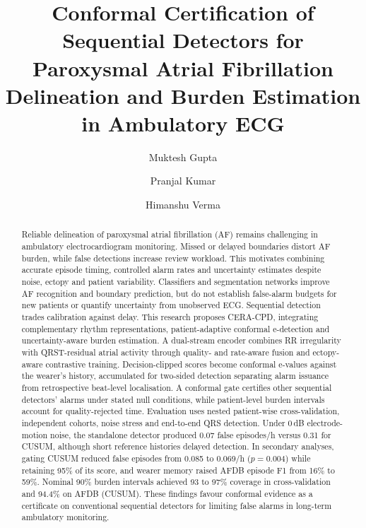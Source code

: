 \documentclass[preprint,12pt]{elsarticle}
\newcommand{\method}{CERA-CPD}
\newcommand{\1}{\mathbf{1}}
\begin{document}
\begin{frontmatter}

\title{Conformal Certification of Sequential Detectors for Paroxysmal Atrial Fibrillation Delineation and Burden Estimation in Ambulatory ECG}

\author[nitj]{Muktesh Gupta}
\author[nitj]{Pranjal Kumar}
\author[nitj]{Himanshu Verma}



\begin{abstract}
Reliable delineation of paroxysmal atrial fibrillation (AF) remains challenging in ambulatory electrocardiogram monitoring. Missed or delayed boundaries distort AF burden, while false detections increase review workload. This motivates combining accurate episode timing, controlled alarm rates and uncertainty estimates despite noise, ectopy and patient variability. Classifiers and segmentation networks improve AF recognition and boundary prediction, but do not establish false-alarm budgets for new patients or quantify uncertainty from unobserved ECG. Sequential detection trades calibration against delay. This research proposes \method{}, integrating complementary rhythm representations, patient-adaptive conformal e-detection and uncertainty-aware burden estimation. A dual-stream encoder combines RR irregularity with QRST-residual atrial activity through quality- and rate-aware fusion and ectopy-aware contrastive training. Decision-clipped scores become conformal e-values against the wearer's history, accumulated for two-sided detection separating alarm issuance from retrospective beat-level localisation. A conformal gate certifies other sequential detectors' alarms under stated null conditions, while patient-level burden intervals account for quality-rejected time. Evaluation uses nested patient-wise cross-validation, independent cohorts, noise stress and end-to-end QRS detection. Under 0\,dB electrode-motion noise, the standalone detector produced 0.07 false episodes/h versus 0.31 for CUSUM, although short reference histories delayed detection. In secondary analyses, gating CUSUM reduced false episodes from 0.085 to 0.069/h ($p=0.004$) while retaining 95\% of its score, and wearer memory raised AFDB episode F1 from 16\% to 59\%. Nominal 90\% burden intervals achieved 93 to 97\% coverage in cross-validation and 94.4\% on AFDB (CUSUM). These findings favour conformal evidence as a certificate on conventional sequential detectors for limiting false alarms in long-term ambulatory monitoring.
\end{abstract}


\end{frontmatter}
\end{document}
